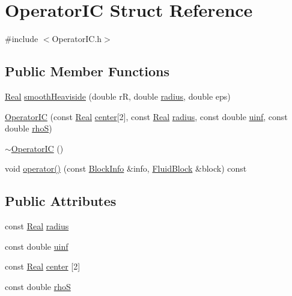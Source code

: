 \hypertarget{struct_operator_i_c}{}\section{Operator\+I\+C Struct Reference}
\label{struct_operator_i_c}


{\ttfamily \#include $<$Operator\+I\+C.\+h$>$}

\subsection*{Public Member Functions}
\begin{DoxyCompactItemize}
\item 
\hyperlink{_h_d_f5_dumper_8h_a445a5f0e2a34c9d97d69a3c2d1957907}{Real} \hyperlink{struct_operator_i_c_a2d78cba7b8f06932f7134b88fed7352c}{smooth\+Heaviside} (double r\+R, double \hyperlink{struct_operator_i_c_a7a8bc805a13e52ca00b1beb4936f97eb}{radius}, double eps)
\item 
\hyperlink{struct_operator_i_c_a9427ff997f1fdaa24a51353670b8334a}{Operator\+I\+C} (const \hyperlink{_h_d_f5_dumper_8h_a445a5f0e2a34c9d97d69a3c2d1957907}{Real} \hyperlink{struct_operator_i_c_a9949826721fef284aa034ea522d8e15a}{center}\mbox{[}2\mbox{]}, const \hyperlink{_h_d_f5_dumper_8h_a445a5f0e2a34c9d97d69a3c2d1957907}{Real} \hyperlink{struct_operator_i_c_a7a8bc805a13e52ca00b1beb4936f97eb}{radius}, const double \hyperlink{struct_operator_i_c_ae9c336ea8e41f02409bf2680b0242c7f}{uinf}, const double \hyperlink{struct_operator_i_c_a1bbb1ac391ab30cbf83f51c2680b109e}{rho\+S})
\item 
\hyperlink{struct_operator_i_c_a6b34e54097004aa47d4ad402e28746c7}{$\sim$\+Operator\+I\+C} ()
\item 
void \hyperlink{struct_operator_i_c_adf547defe5168b4bb0181df741a71144}{operator()} (const \hyperlink{struct_block_info}{Block\+Info} \&info, \hyperlink{struct_fluid_block}{Fluid\+Block} \&block) const 
\end{DoxyCompactItemize}
\subsection*{Public Attributes}
\begin{DoxyCompactItemize}
\item 
const \hyperlink{_h_d_f5_dumper_8h_a445a5f0e2a34c9d97d69a3c2d1957907}{Real} \hyperlink{struct_operator_i_c_a7a8bc805a13e52ca00b1beb4936f97eb}{radius}
\item 
const double \hyperlink{struct_operator_i_c_ae9c336ea8e41f02409bf2680b0242c7f}{uinf}
\item 
const \hyperlink{_h_d_f5_dumper_8h_a445a5f0e2a34c9d97d69a3c2d1957907}{Real} \hyperlink{struct_operator_i_c_a9949826721fef284aa034ea522d8e15a}{center} \mbox{[}2\mbox{]}
\item 
const double \hyperlink{struct_operator_i_c_a1bbb1ac391ab30cbf83f51c2680b109e}{rho\+S}
\end{DoxyCompactItemize}


